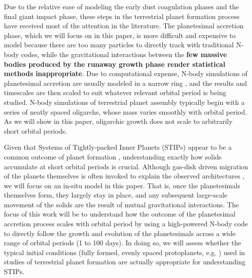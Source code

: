 \documentclass[twocolumn,linenumbers]{aastex63}
\begin{document}
Due to the relative ease of modeling the early dust coagulation phases
and the final giant impact phase, these steps in the terrestrial
planet formation process have received most of the attention in the
literature. The planetesimal accretion phase, which we will focus on
in this paper, is more difficult and expensive to model because there are too
many particles to directly track with traditional N-body codes, while
the gravitational interactions between the \textbf{few massive bodies produced by the runaway growth phase \citep{ida93, kokubo95, kokubo98} render statistical methods inappropriate}. Due to computational expense, N-body simulations of
planetesimal accretion are usually modeled in a narrow
ring \citep{kokubo96, kokubo98}, and the results and timescales are then scaled to suit whatever relevant orbital period is being 
studied. N-body simulations of terrestrial planet assembly typically begin with a series of neatly spaced oligarchs, whose mass 
varies smoothly with orbital period. As we will show in this paper, oligarchic growth does not scale to arbitrarily short
orbital periods.

Given that Systems of Tightly-packed Inner Planets (STIPs) appear to
be a common outcome of planet formation \citep{lantham11, lissauer11, rowe14}, understanding exactly how
solids accumulate at short orbital periods is crucial. Although
gas-disk driven migration of the planets themselves is often invoked
to explain the observed architectures \textbf{\citep{izidoro17, izidoro21}}, we will focus on an in-situ
model in this paper. That is, once the planetesimals themselves form,
they largely stay in place, and any subsequent large-scale movement of
the solids are the result of mutual gravitational interactions. The
focus of this work will be to understand how the outcome of the
planetesimal accretion process scales with orbital period by using a
high-powered N-body code to directly follow the growth and evolution
of the planetesimals across a wide range of orbital periods (1 to 100
days). In doing so, we will assess whether the typical initial conditions (fully formed, evenly spaced protoplanets, e.g. \citet{raymond06}) used in studies of terrestrial planet formation are actually appropriate for understanding STIPs.
\end{document}
